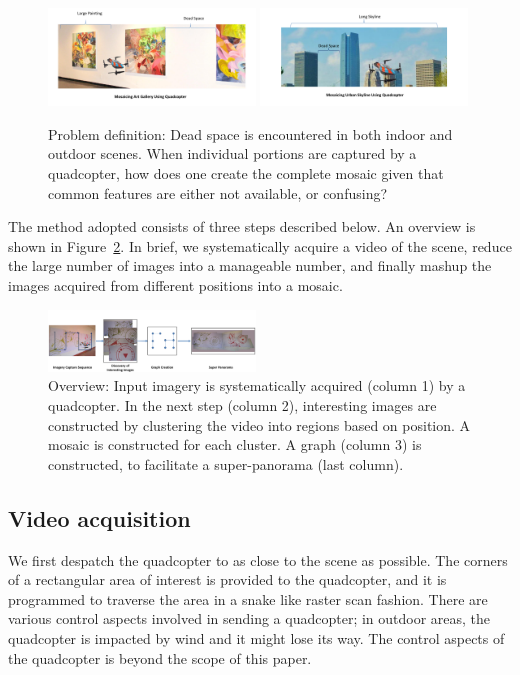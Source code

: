 \documentclass[10pt,twocolumn,letterpaper]{article}
\begin{document}
\begin{figure}[h!]
  \centering
  \includegraphics[width=0.49\textwidth]{figures/indoor} 
  \includegraphics[width=0.49\textwidth]{figures/outdoor}
  \caption{ \label{fig:schematic} Problem definition: Dead space is
    encountered in both indoor and outdoor scenes.  When individual
    portions are captured by a quadcopter, how does one create the
    complete mosaic given that common features are either not
    available, or confusing?
  }
\end{figure}    


The method adopted consists of three steps described below. An
overview is shown in Figure~\ref{fig:workflow}.  In brief, we
systematically acquire a video of the scene, reduce the large number
of images into a manageable number, and finally mashup the images
acquired from different positions into a mosaic.

\begin{figure}[b!]
  \centering
  \includegraphics[width=0.49\textwidth]{figures/Workflow} 
  \caption{ \label{fig:workflow} Overview: Input imagery is
    systematically acquired (column 1) by a quadcopter.  In the next
    step (column 2), interesting images are constructed by clustering
    the video into regions based on position. A mosaic is constructed
    for each cluster.  A graph (column 3) is constructed, to
    facilitate a super-panorama (last column).  }
\end{figure}    


\subsection{Video acquisition}
We first despatch the quadcopter to as close to the scene as
possible. The corners of a rectangular area of interest is provided to
the quadcopter, and it is programmed to traverse the area in a snake
like raster scan fashion.  There are various control aspects involved
in sending a quadcopter; in outdoor areas, the quadcopter is impacted
by wind and it might lose its way.  The control aspects of the
quadcopter is beyond the scope of this paper.
\end{document}
